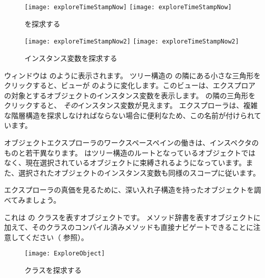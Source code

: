 \documentclass[a4paper,10pt,twoside]{book}
\begin{document}
\begin{figure}[tbp]
\begin{minipage}{0.48\textwidth}
\begin{center}
\ifluluelse
{\texttt{[image: exploreTimeStampNow]}}
{\texttt{[image: exploreTimeStampNow]}}
\end{center}
\caption{  を探求する}
\end{minipage}
\hfill
\begin{minipage}{0.48\textwidth}
\begin{center}
\ifluluelse
{\texttt{[image: exploreTimeStampNow2]}}
{\texttt{[image: exploreTimeStampNow2]}}
\end{center}
\caption{インスタンス変数を探求する}
\end{minipage}
\end{figure}

ウィンドウは  のように表示されます。
ツリー構造の  の隣にある小さな三角形をクリックすると、ビューが  のように変化します。このビューは、エクスプロアの対象とするオブジェクトのインスタンス変数を表示します。
 の隣の三角形をクリックすると、 \emph{その}インスタンス変数が見えます。
エクスプローラは、複雑な階層構造を探求しなければならない場合に便利なため、この名前が付けられています。

オブジェクトエクスプローラのワークスペースペインの働きは、インスペクタのものと若干異なります。
 はツリー構造のルートとなっているオブジェクトではなく、現在選択されているオブジェクトに束縛されるようになっています。また、選択されたオブジェクトのインスタンス変数も同様のスコープに従います。

エクスプローラの真価を見るために、深い入れ子構造を持ったオブジェクトを調べてみましょう。

これは \pharo の  クラスを表すオブジェクトです。
メソッド辞書を表すオブジェクトに加えて、そのクラスのコンパイル済みメソッドも直接ナビゲートできることに注意してください（  参照）。

\begin{figure}[tbp]
\begin{center}
\texttt{[image: ExploreObject]}
\end{center}
\caption{ クラスを探求する}
\end{figure}
\end{document}
